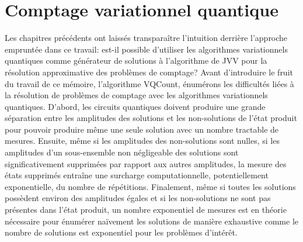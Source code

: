 \chapter{Comptage variationnel quantique}
\label{cha:comptage-variationnel-quantique}

Les chapitres précédents ont laissés transparaître l'intuition derrière l'approche empruntée dans ce travail: est-il possible d'utiliser les algorithmes variationnels quantiques comme générateur de solutions à l'algorithme de JVV pour la résolution approximative des problèmes de comptage? Avant d'introduire le fruit du travail de ce mémoire, l'algorithme VQCount, énumérons les difficultés liées à la résolution de problèmes de comptage avec les algorithmes variationnels quantiques. D'abord, les circuits quantiques doivent produire une grande séparation entre les amplitudes des solutions et les non-solutions de l'état produit pour pouvoir produire même une seule solution avec un nombre tractable de mesures. Ensuite, même si les amplitudes des non-solutions sont nulles, si les amplitudes d'un sous-ensemble non négligeable des solutions sont significativement supprimées par rapport aux autres amplitudes, la mesure des états supprimés entraîne une surcharge computationnelle, potentiellement exponentielle, du nombre de répétitions. Finalement, même si toutes les solutions possèdent environ des amplitudes égales et si les non-solutions ne sont pas présentes dans l'état produit, un nombre exponentiel de mesures est en théorie nécessaire pour énumérer naïvement les solutions de manière exhaustive comme le nombre de solutions est exponentiel pour les problèmes d'intérêt.

